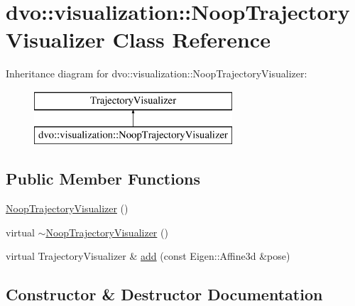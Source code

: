 \hypertarget{classdvo_1_1visualization_1_1_noop_trajectory_visualizer}{}\section{dvo\+:\+:visualization\+:\+:Noop\+Trajectory\+Visualizer Class Reference}
\label{classdvo_1_1visualization_1_1_noop_trajectory_visualizer}
Inheritance diagram for dvo\+:\+:visualization\+:\+:Noop\+Trajectory\+Visualizer\+:\begin{figure}[H]
\begin{center}
\leavevmode
\includegraphics[height=2.000000cm]{classdvo_1_1visualization_1_1_noop_trajectory_visualizer}
\end{center}
\end{figure}
\subsection*{Public Member Functions}
\begin{DoxyCompactItemize}
\item 
\mbox{\hyperlink{classdvo_1_1visualization_1_1_noop_trajectory_visualizer_a215b180a6d70948c2448ed7d0edc0852}{Noop\+Trajectory\+Visualizer}} ()
\item 
virtual \mbox{\hyperlink{classdvo_1_1visualization_1_1_noop_trajectory_visualizer_a2f3efe6c4bb5b294c72c594ef13060ca}{$\sim$\+Noop\+Trajectory\+Visualizer}} ()
\item 
virtual Trajectory\+Visualizer \& \mbox{\hyperlink{classdvo_1_1visualization_1_1_noop_trajectory_visualizer_a40e9cfd01744c3efa85afb93237e2030}{add}} (const Eigen\+::\+Affine3d \&pose)
\end{DoxyCompactItemize}


\subsection{Constructor \& Destructor Documentation}
\mbox{\label{classdvo_1_1visualization_1_1_noop_trajectory_visualizer_a215b180a6d70948c2448ed7d0edc0852}} 
